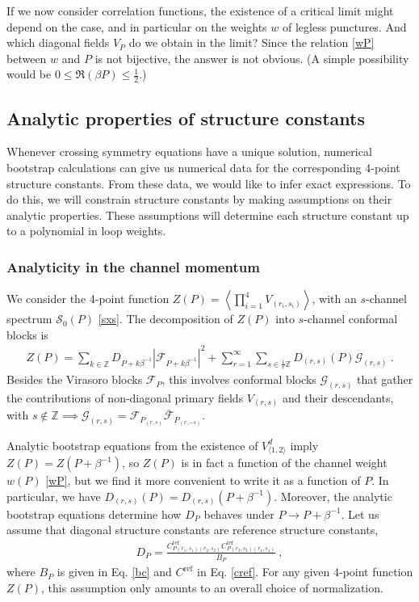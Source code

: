\documentclass[12pt, a4paper]{article}
\theoremstyle{break}
\begin{document}
If we now consider correlation functions, the existence of a critical limit might depend on the case, and in particular on the weights $w$ of legless punctures. And which diagonal fields $V_P$ do we obtain in the limit? Since the relation \eqref{wP} between $w$ and $P$ is not bijective, the answer is not obvious. (A simple possibility would be $0\leq \Re(\beta P)\leq \frac12$.) 


\subsection{Analytic properties of structure constants}

Whenever crossing symmetry equations have a unique solution, numerical bootstrap calculations can give us numerical data for the corresponding 4-point structure constants. From these data, we would like to infer exact expressions. To do this, we will constrain structure constants by making assumptions on their analytic properties. These assumptions will determine each structure constant up to a polynomial in loop weights.

\subsubsection{Analyticity in the channel momentum}

We consider the 4-point function $Z(P)=\left<\prod_{i=1}^4 V_{(r_i,s_i)}\right>$, with an $s$-channel spectrum $\mathcal{S}_0(P)$ \eqref{sxs}. The decomposition of $Z(P)$ into $s$-channel conformal blocks is
\begin{align}
 Z(P) = \sum_{k\in\mathbb{Z}} D_{P+k\beta^{-1}} \left|\mathcal{F}_{P+k\beta^{-1}}\right|^2 +\sum_{r=1}^\infty \sum_{s\in\frac{1}{r}\mathbb{Z}} D_{(r,s)}(P) \mathcal{G}_{(r,s)}\ .
 \label{zop}
\end{align}
Besides the Virasoro blocks $\mathcal{F}_P$, this involves conformal blocks $\mathcal{G}_{(r,s)}$ that gather the contributions of non-diagonal primary fields $V_{(r,s)}$ and their descendants, with $s\notin\mathbb{Z}\implies \mathcal{G}_{(r,s)} = \mathcal{F}_{P_{(r,s)}}\bar{\mathcal{F}}_{P_{(r,-s)}}$. 

Analytic bootstrap equations from the existence of $V^d_{\langle 1,2\rangle}$ imply $Z(P)=Z(P+\beta^{-1})$, so $Z(P)$ is in fact a function of the channel weight $w(P)$ \eqref{wP}, but we find it more convenient to write it as a function of $P$. In particular, we have $D_{(r,s)}(P)=D_{(r,s)}(P+\beta^{-1})$. Moreover, the analytic bootstrap equations 
determine how $D_P$ behaves under $P\to P+\beta^{-1}$. Let us assume that diagonal structure constants are reference structure constants,
\begin{align}
 D_P = \frac{C^\text{ref}_{P(r_1,s_1)(r_2,s_2)}C^\text{ref}_{P(r_3,s_3)(r_4,s_4)}}{B_P}\ ,
 \label{dccb}
\end{align}
where $B_P$ is given in Eq. \eqref{bc} and $C^\text{ref}$ in Eq. \eqref{cref}. For any given 4-point function $Z(P)$, this assumption only amounts to an overall choice of normalization. 
\end{document}
